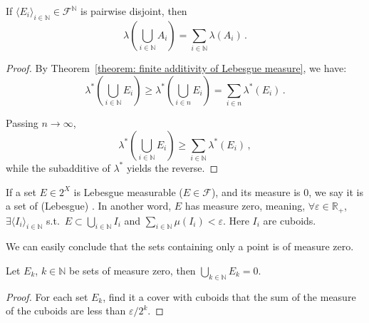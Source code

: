\documentclass[openany]{book}
\begin{document}
\begin{theorem}
	\label{theorem: countable additivity of Lebesgue measure}
	If $\langle E_i\rangle_{i \in \mathbb N} \in \mathscr F^\mathbb N$ is pairwise disjoint, then
	\begin{equation*}
		\lambda \left( 
				\bigcup_{i \in \mathbb N} A_i 
			 \right) = \sum_{i \in \mathbb N} \lambda(A_i)\,.
	\end{equation*}
\end{theorem}
\begin{proof}
	By Theorem~\ref{theorem: finite additivity of Lebesgue measure}, we have:
	\begin{equation*}
		\lambda^*\left( \bigcup_{i \in \mathbb N} E_i \right) 
			\geq \lambda^*\left( \bigcup_{i \in n} E_i \right)
			= \sum_{i \in n} \lambda^*(E_i)\,.
	\end{equation*}

	Passing $n \to \infty$, 
	\begin{equation*}
		\lambda^*\left( \bigcup_{i \in \mathbb N} E_i \right) 
			\geq  \sum_{i \in \mathbb N} \lambda^*(E_i)\,,
	\end{equation*}
	while the subadditive of $\lambda^*$ yields the reverse.
\end{proof}

\begin{definition}
	If a set $E \in 2^X$ is Lebesgue measurable ($E \in \mathscr F$), and its measure is $0$, we say it is a set of (Lebesgue) . 
	In another word, $E$ has measure zero, meaning, $\forall \varepsilon \in \mathbb R_+$, $\exists \langle I_i\rangle_{i \in \mathbb N}$ s.t.\ $E \subset \bigcup_{i \in \mathbb N} I_i$ and $\sum_{i \in \mathbb N} \mu(I_i) < \varepsilon$. 
	Here $I_i$ are cuboids.
\end{definition}

We can easily conclude that the sets containing only a point is of measure zero.

\begin{theorem}
	\label{theorem: the countable union of sets of measure zero is also of measure zero}
	Let $E_k$, $k \in \mathbb N$ be sets of measure zero, then $\bigcup_{k \in \mathbb N} E_k = 0$.
\end{theorem}
\begin{proof}
	For each set $E_k$, find it a cover with cuboids that the sum of the measure of the cuboids are less than $\varepsilon / 2^k$.
\end{proof}
\end{document}
